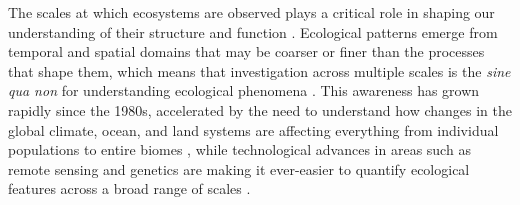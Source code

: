 \documentclass[12pt]{article}
\begin{document}


\linenumbers
\vspace{10pt}
The scales at which ecosystems are observed plays a critical role in shaping our understanding of their structure and function \cite{levin_problem_1992,chave_problem_2013,wiens_spatial_1989}.  Ecological patterns emerge from temporal and spatial domains that may be coarser or finer than the processes that shape them, which means that investigation across multiple scales is the \emph{sine qua non} for understanding ecological phenomena \cite{levin_problem_1992}. This awareness has grown rapidly since the 1980s, accelerated by the need to understand how changes in the global climate, ocean, and land systems are affecting everything from individual populations \cite{tingley_push_2012} to entire biomes \cite{xiao_photosynthetic_2004}, while technological advances in areas such as remote sensing and genetics are making it ever-easier to quantify ecological features across a broad range of scales \cite{schneider_rise_2001, chave_problem_2013}.  
\end{document}
